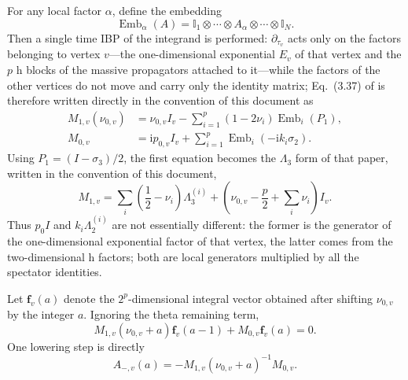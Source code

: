 \documentclass[11pt,a4paper]{article}
\newcommand{\ii}{\mathrm i}
\newcommand{\Id}{\mathbb I}
\newcommand{\Emb}{\operatorname{Emb}}
\begin{document}
For any local factor $\alpha$, define the embedding
\begin{equation}
 \Emb_\alpha(A)
 =\Id_1\otimes\cdots\otimes A_\alpha\otimes\cdots\otimes \Id_N.
 \label{eq:embedding-definition}
\end{equation}
Then a single time IBP of the integrand is performed: $\partial_{\tau_v}$ acts only on the factors belonging to vertex $v$---the one-dimensional exponential $E_v$ of that vertex and the $p$ h blocks of the massive propagators attached to it---while the factors of the other vertices do not move and carry only the identity matrix; Eq.~(3.37) of \cite{Chen:2023eic} is therefore written directly in the convention of this document as
\begin{align}
 M_{1,v}(\nu_{0,v})
 &=\nu_{0,v}I_v
 -\sum_{i=1}^{p}(1-2\nu_i)\Emb_i(P_1),
 \label{eq:massive-M1-projector}\\
 M_{0,v}
 &=\ii p_{0,v}I_v
 +\sum_{i=1}^{p}\Emb_i(-\ii k_i\sigma_2).
 \label{eq:massive-M0-kronecker}
\end{align}
Using $P_1=(I-\sigma_3)/2$, the first equation becomes the $\Lambda_3$ form of that paper, written in the convention of this document,
\begin{equation}
 M_{1,v}
 =\sum_i\left(\frac12-\nu_i\right)\Lambda_3^{(i)}
 +\left(\nu_{0,v}-\frac p2+\sum_i\nu_i\right)I_v.
\end{equation}
Thus $p_0I$ and $k_i\Lambda_2^{(i)}$ are not essentially different: the former is the generator of the one-dimensional exponential factor of that vertex, the latter comes from the two-dimensional h factors; both are local generators multiplied by all the spectator identities.

Let $\bm f_v(a)$ denote the $2^p$-dimensional integral vector obtained after shifting $\nu_{0,v}$ by the integer $a$. Ignoring the theta remaining term,
\begin{equation}
 M_{1,v}(\nu_{0,v}+a)\bm f_v(a-1)
 +M_{0,v}\bm f_v(a)=0.
 \label{eq:massive-vertex-ibp}
\end{equation}
One lowering step is directly
\begin{equation}
 A_{-,v}(a)
 =-M_{1,v}(\nu_{0,v}+a)^{-1}M_{0,v}.
 \label{eq:Aminus-local}
\end{equation}
\end{document}
